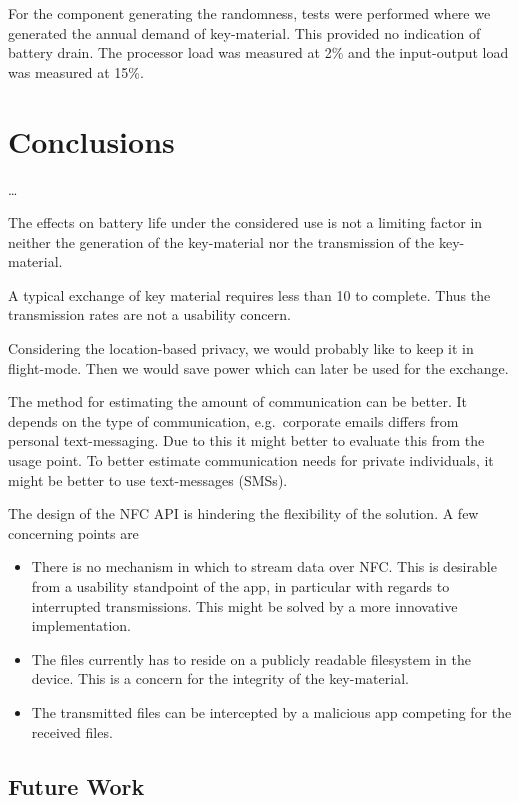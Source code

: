 For the component generating the randomness, tests were performed where we 
generated the annual demand of key-material.
This provided no indication of battery drain.
The processor load was measured at \unit{2}{\%} and the input-output load was 
  measured at \unit{15}{\%}. 


\section{Conclusions}
\label{sec:Conclusions}

\dots

The effects on battery life under the considered use is not a limiting factor 
in neither the generation of the key-material nor the transmission of the 
key-material. 

A typical exchange of key material requires less than \unit{10}{\second} to 
complete.
Thus the transmission rates are not a usability concern.

Considering the location-based privacy, we would probably like to keep it in 
flight-mode.
Then we would save power which can later be used for the exchange.

The method for estimating the amount of communication can be better.
It depends on the type of communication, e.g.~corporate emails differs from 
personal text-messaging.
Due to this it might better to evaluate this from the usage point.
To better estimate communication needs for private individuals, it might be 
better to use text-messages (SMSs).

The design of the \ac{NFC} API is hindering the flexibility of the solution.  
A few concerning points are
\begin{itemize}
  \item There is no mechanism in which to stream data over \ac{NFC}\@.
    This is desirable from a usability standpoint of the app, in particular 
    with regards to interrupted transmissions.
    This might be solved by a more innovative implementation.
  \item The files currently has to reside on a publicly readable filesystem in 
    the device.
    This is a concern for the integrity of the key-material.
  \item The transmitted files can be intercepted by a malicious app competing 
    for the received files.
\end{itemize}

\subsection{Future Work}

